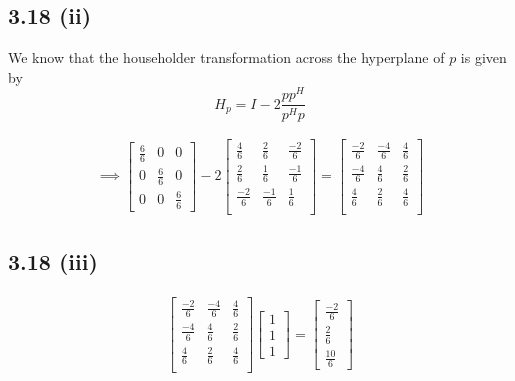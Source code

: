 \documentclass[letterpaper,12pt]{article}
\theoremstyle{definition}
\begin{document}
\subsection*{3.18 (ii)}
We know that the householder transformation across the hyperplane of $p$ is given by \[H_p = I - 2 \frac{pp^H}{p^Hp}\]

\begin{align*}
    \implies 
    \begin{bmatrix}
        \frac{6}{6} & 0 & 0 \\
        0 & \frac{6}{6} & 0 \\
        0 & 0 & \frac{6}{6}
    \end{bmatrix}
    - 2
    \begin{bmatrix}
        \frac{4}{6}& \frac{2}{6} & \frac{-2}{6} \\
        \frac{2}{6}& \frac{1}{6} & \frac{-1}{6} \\
        \frac{-2}{6}& \frac{-1}{6} & \frac{1}{6} \\
    \end{bmatrix}
    =
    \begin{bmatrix}
        \frac{-2}{6}& \frac{-4}{6} & \frac{4}{6} \\
        \frac{-4}{6}& \frac{4}{6} & \frac{2}{6} \\
        \frac{4}{6}& \frac{2}{6} & \frac{4}{6} \\
    \end{bmatrix}
\end{align*}

\subsection*{3.18 (iii)}
\begin{align*}
    \begin{bmatrix}
        \frac{-2}{6}& \frac{-4}{6} & \frac{4}{6} \\
        \frac{-4}{6}& \frac{4}{6} & \frac{2}{6} \\
        \frac{4}{6}& \frac{2}{6} & \frac{4}{6} \\
    \end{bmatrix}
    \begin{bmatrix}
        1\\1\\1
    \end{bmatrix}
    = 
    \begin{bmatrix}
        \frac{-2}{6}\\\frac{2}{6}\\\frac{10}{6}
    \end{bmatrix}
\end{align*}
\end{document}
